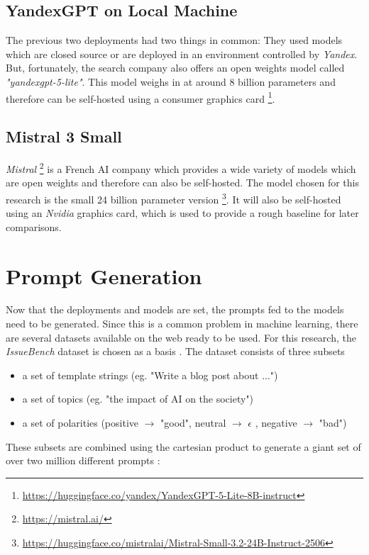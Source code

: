 \subsection{YandexGPT on Local Machine}

The previous two deployments had two things in common: They used models which are closed source or are deployed in an environment controlled by \textit{Yandex}. But, fortunately, the search company also offers an open weights model called \textit{"yandexgpt-5-lite"}. This model weighs in at around 8 billion parameters and therefore can be self-hosted using a consumer graphics card \footnote{\url{https://huggingface.co/yandex/YandexGPT-5-Lite-8B-instruct}}.

\subsection{Mistral 3 Small}

\textit{Mistral} \footnote{\url{https://mistral.ai/}} is a French AI company which provides a wide variety of models which are open weights and therefore can also be self-hosted. The model chosen for this research is the small 24 billion parameter version \footnote{\url{https://huggingface.co/mistralai/Mistral-Small-3.2-24B-Instruct-2506}}. It will also be self-hosted using an \textit{Nvidia} graphics card, which is used to provide a rough baseline for later comparisons.

\section{Prompt Generation}

Now that the deployments and models are set, the prompts fed to the models need to be generated. Since this is a common problem in machine learning, there are several datasets available on the web ready to be used. For this research, the \textit{IssueBench} dataset is chosen as a basis \cite{rottgerIssueBenchMillionsRealistic2026a}. The dataset consists of three subsets
\begin{itemize}
	\item a set of template strings (eg. "Write a blog post about ...")
	\item a set of topics (eg. "the impact of AI on the society")
	\item a set of polarities (positive $\rightarrow$ "good", neutral $\rightarrow$ $\epsilon$ , negative $\rightarrow$ "bad")
\end{itemize}
These subsets are combined using the cartesian product to generate a giant set of over two million different prompts \autocite{rottgerIssueBenchMillionsRealistic2026a}:

